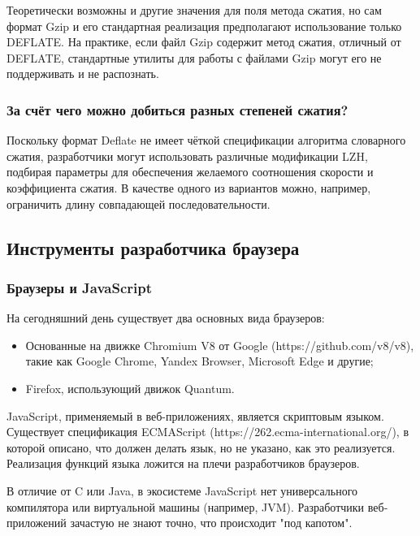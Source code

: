 \documentclass[12pt]{article}
\begin{document}
Теоретически возможны и другие значения для поля метода сжатия,
но сам формат Gzip и его стандартная реализация предполагают использование только DEFLATE.
На практике, если файл Gzip содержит метод сжатия, отличный от DEFLATE,
стандартные утилиты для работы с файлами Gzip могут его не поддерживать и не распознать.

\subsubsection{За счёт чего можно добиться разных степеней сжатия?}

Поскольку формат Deflate не имеет чёткой спецификации алгоритма словарного сжатия,
разработчики могут использовать различные модификации LZH, подбирая параметры
для обеспечения желаемого соотношения скорости и коэффициента сжатия.
В качестве одного из вариантов можно, например, ограничить длину совпадающей последовательности.

\subsection{Инструменты разработчика браузера}

\subsubsection{Браузеры и JavaScript}

На сегодняшний день существует два основных вида браузеров:

\begin{itemize}[label=-]
    \item Основанные на движке Chromium V8 от Google (https://github.com/v8/v8), такие как
          Google Chrome, Yandex Browser, Microsoft Edge и другие;
    \item Firefox, использующий движок Quantum.
\end{itemize}

JavaScript, применяемый в веб-приложениях, является скриптовым языком.
Существует спецификация ECMAScript (https://262.ecma-international.org/),
в которой описано, что должен делать язык, но не указано, как это реализуется.
Реализация функций языка ложится на плечи разработчиков браузеров.

В отличие от C или Java, в экосистеме JavaScript нет универсального компилятора
или виртуальной машины (например, JVM).
Разработчики веб-приложений зачастую не знают точно, что происходит "под капотом".
\end{document}
